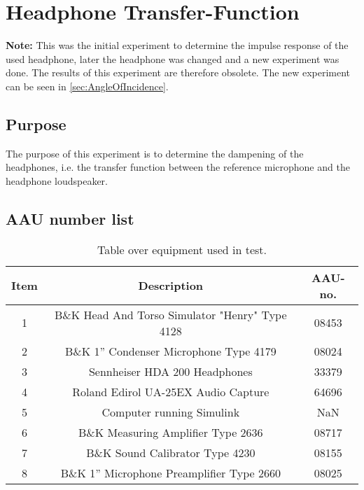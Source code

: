 \section{Headphone Transfer-Function} \label{sec:HPjournal}
\textbf{Note:} This was the initial experiment to determine the impulse response of the used headphone, later the headphone was changed and a new experiment was done. The results of this experiment are therefore obsolete. The new experiment can be seen in \autoref{sec:AngleOfIncidence}.
\subsection{Purpose}
The purpose of this experiment is to determine the dampening of the headphones, i.e. the transfer function between the reference microphone and the headphone loudspeaker.

\subsection{AAU number list}
\begin{table}[H]
	\centering
	\begin{tabular}{ c c c } \toprule
		{Item}	& {Description} 						& {AAU-no}. \\ \bottomrule 
		1	&	B\&K Head And Torso Simulator "Henry" Type 4128	& 08453		\\
		2	&	B\&K 1'' Condenser Microphone Type 4179 & 08024\\
		3	&	Sennheiser HDA 200	Headphones			& 33379		\\
		4	&	Roland Edirol UA-25EX Audio Capture		& 64696		\\
		5	&	Computer running Simulink					& NaN		\\
		6	&	B\&K Measuring Amplifier Type 2636	& 08717		\\
		7	&	B\&K Sound Calibrator Type 4230			& 08155		\\ 
		8	&	B\&K 1'' Microphone Preamplifier Type 2660	& 08025		\\
		\bottomrule
	\end{tabular}
	\caption{Table over equipment used in test.}
	\label{tab:UsedEquipmentListningHP}
\end{table}

